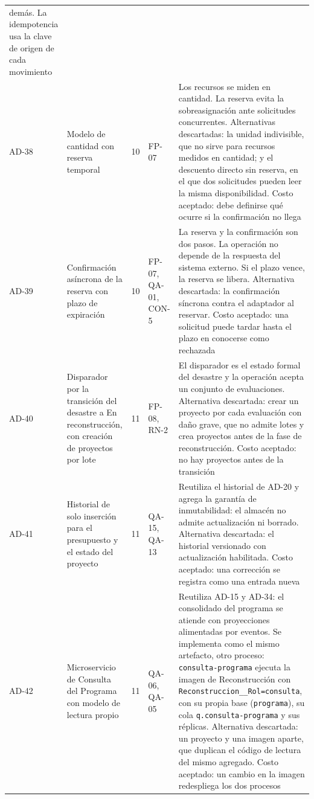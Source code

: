 \documentclass[11pt,letterpaper]{article}
\providecommand{\br}{\discretionary{}{}{}}
\begin{document}
\begin{longtable}{L{1.15cm} L{3.5cm} L{0.7cm} L{1.9cm} L{8.0cm}}
demás. La idempotencia usa la clave de origen de cada movimiento \\
AD-38 & Modelo de cantidad con reserva temporal & 10 & FP-07 & Los recursos se miden en cantidad.
La reserva evita la sobreasignación ante solicitudes concurrentes. Alternativas descartadas: la
unidad indivisible, que no sirve para recursos medidos en cantidad; y el descuento directo sin
reserva, en el que dos solicitudes pueden leer la misma disponibilidad. Costo aceptado: debe
definirse qué ocurre si la confirmación no llega \\
AD-39 & Confirmación asíncrona de la reserva con plazo de expiración & 10 & FP-07, QA-01, CON-5 &
La reserva y la confirmación son dos pasos. La operación no depende de la respuesta del sistema
externo. Si el plazo vence, la reserva se libera. Alternativa descartada: la confirmación síncrona
contra el adaptador al reservar. Costo aceptado: una solicitud puede tardar hasta el plazo en
conocerse como rechazada \\
AD-40 & Disparador por la transición del desastre a En reconstrucción, con creación de proyectos
por lote & 11 & FP-08, RN-2 & El disparador es el estado formal del desastre y la operación acepta
un conjunto de evaluaciones. Alternativa descartada: crear un proyecto por cada evaluación con daño
grave, que no admite lotes y crea proyectos antes de la fase de reconstrucción. Costo aceptado: no
hay proyectos antes de la transición \\
AD-41 & Historial de solo inserción para el presupuesto y el estado del proyecto & 11 & QA-15,
QA-13 & Reutiliza el historial de AD-20 y agrega la garantía de inmutabilidad: el almacén no admite
actualización ni borrado. Alternativa descartada: el historial versionado con actualización
habilitada. Costo aceptado: una corrección se registra como una entrada nueva \\
AD-42 & Microservicio de Consulta del Programa con modelo de lectura propio & 11 & QA-06, QA-05 &
Reutiliza AD-15 y AD-34: el consolidado del programa se atiende con proyecciones alimentadas por
eventos. Se implementa como el mismo artefacto, otro proceso: \texttt{consulta-\br{}programa} ejecuta la
imagen de Reconstrucción con \texttt{Reconstruccion\_\br{}\_\br{}Rol=consulta}, con su propia base
(\texttt{programa}), su cola \texttt{q.\br{}consulta-\br{}programa} y sus réplicas. Alternativa descartada: un
proyecto y una imagen aparte, que duplican el código de lectura del mismo agregado. Costo aceptado:
un cambio en la imagen redespliega los dos procesos \\

\end{longtable}
\end{document}
